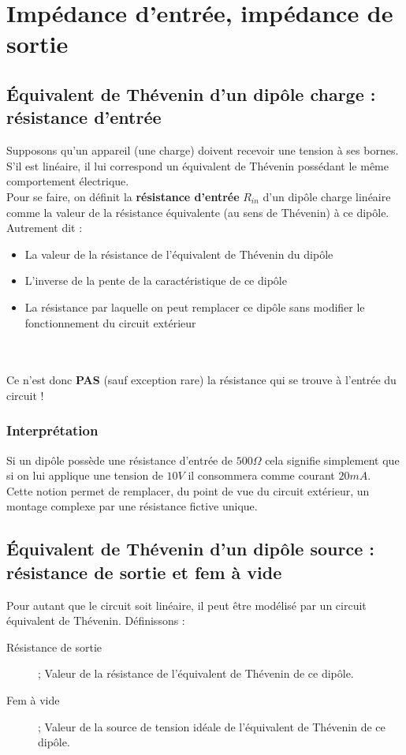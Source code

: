 \documentclass[british,french,11pt, a4paper, openany]{book}
\begin{document}
		\section{Impédance d'entrée, impédance de sortie}
		\subsection{Équivalent de Thévenin d'un dipôle charge : résistance d'entrée}
		Supposons qu'un appareil (une charge) doivent recevoir une tension à ses bornes. S'il est linéaire, il lui correspond un équivalent de Thévenin possédant le même comportement électrique.\\
		
		Pour se faire, on définit la \textbf{résistance d'entrée} $R_{in}$ d'un dipôle charge linéaire comme la valeur de la résistance équivalente (au sens de Thévenin) à ce dipôle. Autrement dit :
		\begin{itemize}
			\item La valeur de la résistance de l'équivalent de Thévenin du dipôle
			\item L'inverse de la pente de la caractéristique de ce dipôle
			\item La résistance par laquelle on peut remplacer ce dipôle sans modifier le fonctionnement du circuit extérieur
		\end{itemize}\ \\
		\ \\
		Ce n'est donc \textbf{PAS} (sauf exception rare) la résistance qui se trouve à l'entrée du circuit !
		\subsubsection{Interprétation}
		Si un dipôle possède une résistance d'entrée de $500\Omega$ cela signifie simplement que si on lui applique une tension de $10V$ il consommera comme courant $20 mA$.\\
		
		Cette notion permet de remplacer, du point de vue du circuit extérieur, un montage complexe par une résistance fictive unique.
		
		\subsection{Équivalent de Thévenin d'un dipôle source : résistance de sortie et fem à vide}
		Pour autant que le circuit soit linéaire, il peut être modélisé par un circuit équivalent de Thévenin. Définissons :
		\begin{description}
			\item[Résistance de sortie] ; Valeur de la résistance de l'équivalent de Thévenin de ce dipôle.
			\item[Fem à vide] ; Valeur de la source de tension idéale de l'équivalent de Thévenin de ce dipôle.
		\end{description}
		
\end{document}

